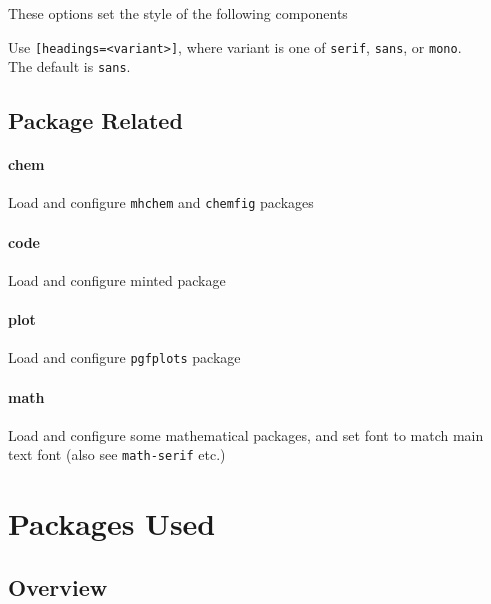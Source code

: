 \documentclass[solid,math,chem,code,plot,gloss]{bmc}
\begin{document}
These options set the style of the following components

Use \texttt{[headings=<variant>]}, where variant is one of  \texttt{serif}, \texttt{sans}, or \texttt{mono}.
\\The default is \texttt{sans}.

\subsection{Package Related}

\paragraph{\ttfamily chem}
Load and configure \texttt{mhchem} and \texttt{chemfig} packages

\paragraph{\ttfamily code}
Load and configure minted package

\paragraph{\ttfamily plot}
Load and configure \texttt{pgfplots} package

\paragraph{\ttfamily math}
Load and configure some mathematical packages, and set font to match main text font (also see \texttt{math-serif} etc.)

\newpage
\section{Packages Used}

\subsection{Overview}
\end{document}
